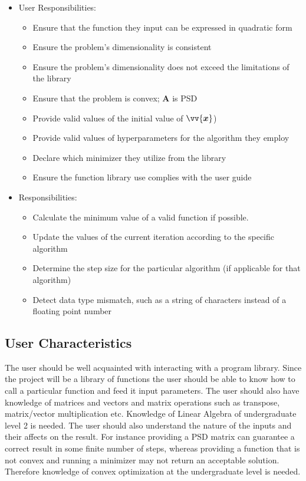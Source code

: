 \documentclass[12pt]{article}
\begin{document}
\begin{itemize}
\item User Responsibilities:
\begin{itemize}
\item Ensure that the function they input can be expressed in quadratic form
\item Ensure the problem's dimensionality is consistent
\item Ensure the problem's dimensionality does not exceed the limitations of the library
\item Ensure that the problem is convex; $\mathbf{A}$ is PSD
\item Provide valid values of the initial value of $\vv{\bm{x}}$)
\item Provide valid values of hyperparameters for the algorithm they employ
\item Declare which minimizer they utilize from the library
\item Ensure the function library use complies with the user guide
\end{itemize}
\item {} Responsibilities:
\begin{itemize}
\item Calculate the minimum value of a valid function if possible.
\item Update the values of the current iteration according to the specific algorithm
\item Determine the step size for the particular algorithm (if applicable for that algorithm)
\item Detect data type mismatch, such as a string of characters instead of a
  floating point number
\end{itemize}
\end{itemize}



\subsection{User Characteristics} \label{SecUserCharacteristics}
The user should be well acquainted with interacting with a program library. Since the project will be a library of functions the user should be able to know how to call a particular function and feed it input parameters. The user should also have knowledge of matrices and vectors and matrix operations such as transpose, matrix/vector multiplication etc. Knowledge of Linear Algebra of undergraduate level 2 is needed. The user should also understand the nature of the inputs and their affects on the result. For instance providing a PSD matrix can guarantee a correct result in some finite number of steps, whereas providing a function that is not convex and running a minimizer may not return an acceptable solution. Therefore knowledge of convex optimization at the undergraduate level is needed. 
\\
\end{document}
